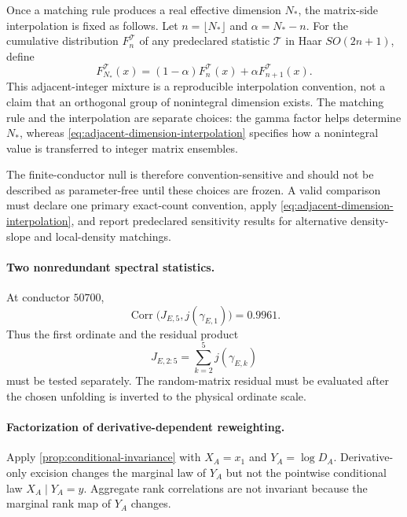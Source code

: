 \documentclass[11pt,reqno]{amsart}
\theoremstyle{remark}
\newcommand{\Corr}{\operatorname{Corr}}
\begin{document}
Once a matching rule produces a real effective dimension $N_*$, the matrix-side interpolation is fixed as follows.  Let $n=\lfloor N_*\rfloor$ and $\alpha=N_*-n$.  For the cumulative distribution $F_n^{\mathcal T}$ of any predeclared statistic $\mathcal T$ in Haar $SO(2n+1)$, define
\begin{equation}
  F_{N_*}^{\mathcal T}(x)
  =(1-\alpha)F_n^{\mathcal T}(x)
   +\alpha F_{n+1}^{\mathcal T}(x).
  \label{eq:adjacent-dimension-interpolation}
\end{equation}
This adjacent-integer mixture is a reproducible interpolation convention, not a claim that an orthogonal group of nonintegral dimension exists.  The matching rule and the interpolation are separate choices: the gamma factor helps determine $N_*$, whereas \eqref{eq:adjacent-dimension-interpolation} specifies how a nonintegral value is transferred to integer matrix ensembles.

The finite-conductor null is therefore convention-sensitive and should not be described as parameter-free until these choices are frozen.  A valid comparison must declare one primary exact-count convention, apply \eqref{eq:adjacent-dimension-interpolation}, and report predeclared sensitivity results for alternative density-slope and local-density matchings.

\paragraph{Two nonredundant spectral statistics.}
At conductor $50700$,
\begin{equation}
  \Corr\bigl(J_{E,5},j(\gamma_{E,1})\bigr)=0.9961.
\end{equation}
Thus the first ordinate and the residual product
\begin{equation}
  J_{E,2:5}=\sum_{k=2}^{5}j(\gamma_{E,k})
  \label{eq:residual-product}
\end{equation}
must be tested separately.  The random-matrix residual must be evaluated after the chosen unfolding is inverted to the physical ordinate scale.

\paragraph{Factorization of derivative-dependent reweighting.}
Apply \cref{prop:conditional-invariance} with $X_A=x_1$ and $Y_A=\log D_A$.  Derivative-only excision changes the marginal law of $Y_A$ but not the pointwise conditional law $X_A\mid Y_A=y$.  Aggregate rank correlations are not invariant because the marginal rank map of $Y_A$ changes.
\end{document}

